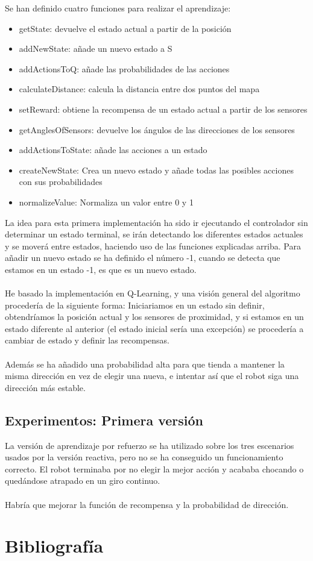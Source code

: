 \documentclass[14pt]{extarticle}
\theoremstyle{definition}
\theoremstyle{remark}
\begin{document}
Se han definido cuatro funciones para realizar el aprendizaje:
\begin{itemize}
	\item getState: devuelve el estado actual a partir de la posición
	\item addNewState: añade un nuevo estado a S
	\item addActionsToQ: añade las probabilidades de las acciones
	\item calculateDistance: calcula la distancia entre dos puntos del mapa
	\item setReward: obtiene la recompensa de un estado actual a partir de los sensores
	\item getAnglesOfSensors: devuelve los ángulos de las direcciones de los sensores	
	\item addActionsToState: añade las acciones a un estado
	\item createNewState: Crea un nuevo estado y añade todas las posibles acciones con sus probabilidades
	\item normalizeValue: Normaliza un valor entre 0 y 1
\end{itemize}

La idea para esta primera implementación ha sido ir ejecutando el controlador sin determinar un estado terminal, se irán detectando los diferentes estados actuales y se moverá entre estados, haciendo uso de las funciones explicadas arriba. Para añadir un nuevo estado se ha definido el número -1, cuando se detecta que estamos en un estado -1, es que es un nuevo estado.\\\\
He basado la implementación en Q-Learning, y una visión general del algoritmo procedería de la siguiente forma: Iniciariamos en un estado sin definir, obtendríamos la posición actual y los sensores de proximidad, y si estamos en un estado diferente al anterior (el estado inicial sería una excepción) se procedería a cambiar de estado y definir las recompensas.\\\\
Además se ha añadido una probabilidad alta para que tienda a mantener la misma dirección en vez de elegir una nueva, e intentar así que el robot siga una dirección más estable.
\subsection{Experimentos: Primera versión}\label{subsec:experimentosprimeraversion}
La versión de aprendizaje por refuerzo se ha utilizado sobre los tres escenarios usados por la versión reactiva, pero no se ha conseguido un funcionamiento correcto. El robot terminaba por no elegir la mejor acción y acababa chocando o quedándose atrapado en un giro continuo.\\\\
Habría que mejorar la función de recompensa y la probabilidad de dirección.

\newpage
\section{Bibliografía}\label{sec:bibliografia}


\end{document}
